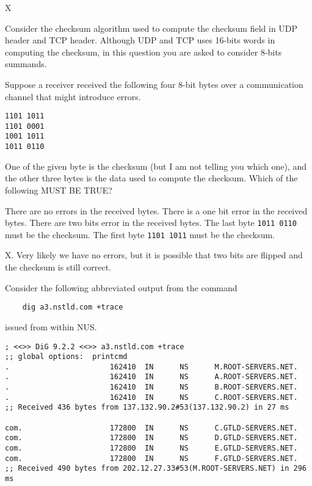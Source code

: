 \documentclass[a4paper,11pt,answers]{exam}
\begin{document}
\begin{questions}
\begin{solution}
X 
\end{solution}

\newpage
\question
Consider the checksum algorithm used to compute the checksum field in UDP   header and TCP header.  Although UDP and TCP uses 16-bits words in computing the checksum, in this  question you are asked to consider 8-bits summands.

Suppose a receiver received the following four 8-bit bytes over a           communication channel that might introduce errors.
\begin{verbatim}
1101 1011
1101 0001
1001 1011
1011 0110
\end{verbatim}
One of the given byte is the checksum (but I am not telling you which one), and the other three bytes is the data used to compute the checksum.  Which of the following MUST BE TRUE?
								          \begin{choices} 
\choice There are no errors in the received bytes.
\choice There is a one bit error in the received bytes.
\choice There are two bits error in the received bytes.
\choice The last byte \texttt{1011 0110} must be the checksum.
\choice The first byte \texttt{1101 1011} must be the checksum.
\end{choices}

\begin{solution}
X.  Very likely we have no errors, but it is possible that two bits are flipped and the checksum is still correct.
\end{solution}

\question
Consider the following abbreviated output from the command
\begin{verbatim}
    dig a3.nstld.com +trace
\end{verbatim}
    issued from within NUS. 
\begin{verbatim}
; <<>> DiG 9.2.2 <<>> a3.nstld.com +trace
;; global options:  printcmd
.                       162410  IN      NS      M.ROOT-SERVERS.NET.
.                       162410  IN      NS      A.ROOT-SERVERS.NET.
.                       162410  IN      NS      B.ROOT-SERVERS.NET.
.                       162410  IN      NS      C.ROOT-SERVERS.NET.
;; Received 436 bytes from 137.132.90.2#53(137.132.90.2) in 27 ms

com.                    172800  IN      NS      C.GTLD-SERVERS.NET.
com.                    172800  IN      NS      D.GTLD-SERVERS.NET.
com.                    172800  IN      NS      E.GTLD-SERVERS.NET.
com.                    172800  IN      NS      F.GTLD-SERVERS.NET.
;; Received 490 bytes from 202.12.27.33#53(M.ROOT-SERVERS.NET) in 296 ms


\end{verbatim}
\end{questions}
\end{document}
